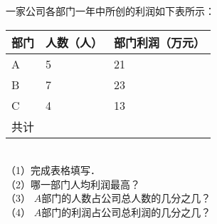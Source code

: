 
一家公司各部门一年中所创的利润如下表所示：\\
\begin{tabular}{|l|l|l|}
	\hline
	部门\hspace{4em} & 人数（人） &  部门利润（万元）  \\ \hline
	A & 5 & 21 \\ \hline
	B & 7 &  23  \\ \hline
	C & 4 & 13 \\ \hline
	共计 &   &     \\ \hline
\end{tabular}\\
（1）完成表格填写．\\
（2）哪一部门人均利润最高？\\
（3） $A$部门的人数占公司总人数的几分之几？\\
（4） $A$部门的利润占公司总利润的几分之几？\\

